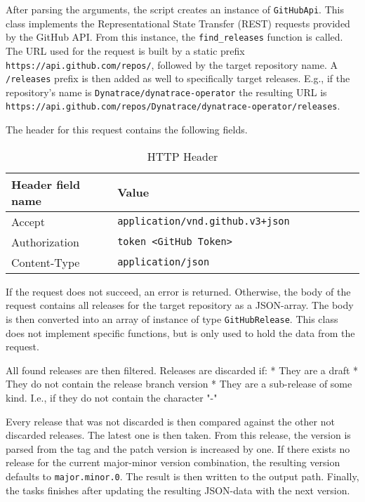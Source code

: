 After parsing the arguments, the script creates an instance of \verb|GitHubApi|.
This class implements the Representational State Transfer (REST) requests provided by the GitHub API.
From this instance, the \verb|find_releases| function is called.
The URL used for the request is built by a static prefix \verb|https://api.github.com/repos/|, followed by the target repository name.
A \verb|/releases| prefix is then added as well to specifically target releases.
E.g., if the repository's name is \verb|Dynatrace/dynatrace-operator| the resulting URL is \verb|https://api.github.com/repos/Dynatrace/dynatrace-operator/releases|.

The header for this request contains the following fields.

\begin{table}
    \centering
    \caption{HTTP Header}
    \label{tab:http-header}
    \begin{tabular}{p{0.3\linewidth}|p{0.7\linewidth}}
        Header field name & Value \\
        \hline
        Accept & \verb|application/vnd.github.v3+json| \\
        Authorization & \verb|token <GitHub Token>| \\
        Content-Type & \verb|application/json| \\
    \end{tabular}
\end{table}

If the request does not succeed, an error is returned.
Otherwise, the body of the request contains all releases for the target repository as a JSON-array.
The body is then converted into an array of instance of type \verb|GitHubRelease|.
This class does not implement specific functions, but is only used to hold the data from the request.

All found releases are then filtered.
Releases are discarded if:
* They are a draft
* They do not contain the release branch version
* They are a sub-release of some kind. I.e., if they do not contain the character "-"

Every release that was not discarded is then compared against the other not discarded releases.
The latest one is then taken.
From this release, the version is parsed from the tag and the patch version is increased by one.
If there exists no release for the current major-minor version combination, the resulting version defaults to \verb|major.minor.0|.
The result is then written to the output path.
Finally, the tasks finishes after updating the resulting JSON-data with the next version.

